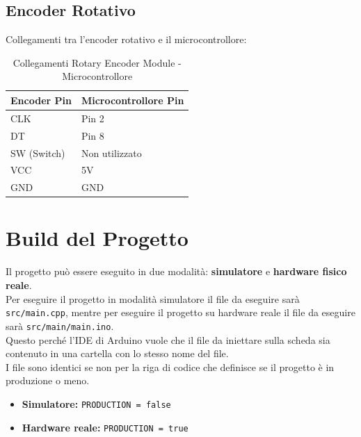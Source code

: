 \documentclass[a4paper, 12pt]{article}
\begin{document}
\subsection{Encoder Rotativo}
\label{subsec:setup-encoder}
Collegamenti tra l'encoder rotativo e il microcontrollore:

\begin{table}[H]
    \centering
    \caption{Collegamenti Rotary Encoder Module - Microcontrollore}
    \label{tab:rotary-encoder-connections}
    \begin{tabular}{ll}
        \toprule
        \textbf{Encoder Pin} & \textbf{Microcontrollore Pin} \\
        \midrule
        CLK                  & Pin 2                         \\
        DT                   & Pin 8                         \\
        SW (Switch)          & Non utilizzato                \\
        VCC                  & 5V                            \\
        GND                  & GND                           \\
        \bottomrule
    \end{tabular}
\end{table}

\section{Build del Progetto}
\label{sec:build}
Il progetto può essere eseguito in due modalità: \textbf{simulatore} e \textbf{hardware fisico reale}.\\
Per eseguire il progetto in modalità simulatore il file da eseguire sarà \texttt{src/main.cpp}, mentre per eseguire il progetto su hardware
reale il file da eseguire sarà \texttt{src/main/main.ino}.\\
Questo perché l'IDE di Arduino vuole che il file da iniettare sulla scheda sia contenuto in una cartella con lo stesso nome del file.\\
I file sono identici se non per la riga di codice che definisce se il progetto è in produzione o meno.
\begin{itemize}
    \item \textbf{Simulatore:} \texttt{PRODUCTION = false}
    \item \textbf{Hardware reale:} \texttt{PRODUCTION = true}
\end{itemize}
\end{document}
